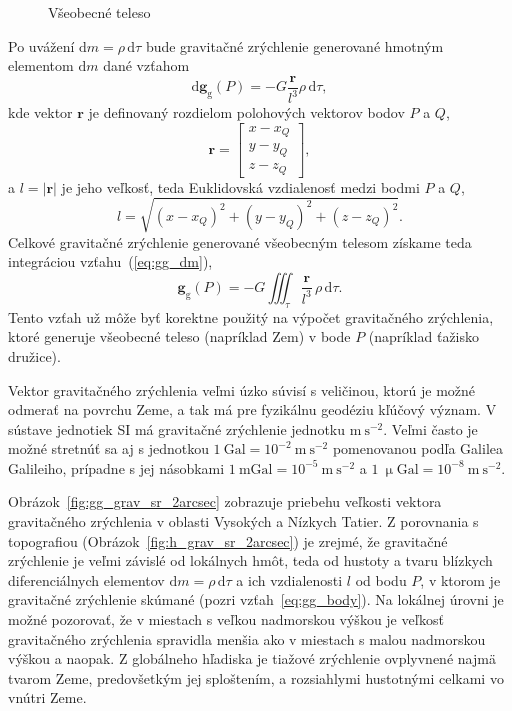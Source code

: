 \documentclass[a4paper, 12pt]{book}
\newcommand{\diff}{\mathrm d}
\newcommand{\gidx}{\mathrm g}
\let\vec\mathbf
\begin{document}
\begin{figure}
\centering

\caption{Všeobecné teleso}
\label{fig:gravitating_body}
\end{figure}

Po uvážení $\diff m = \rho \, \diff \tau$ bude gravitačné zrýchlenie generované 
hmotným elementom $\diff m$ dané vzťahom
%
\begin{equation}
\label{eq:gg_dm}
\diff \vec g_\gidx(P) = -G \frac{\vec r}{l^3} \rho \, \diff\tau{,}
\end{equation}
%
kde vektor $\vec r$ je definovaný rozdielom polohových vektorov bodov $P$ 
a $Q$,
%
\begin{equation}
\label{eq:r}
\vec r = 
%
\begin{bmatrix}
x - x_Q \\
y - y_Q \\
z - z_Q
\end{bmatrix}
{,}
\end{equation}
%
a $l = | \vec r |$ je jeho veľkosť, teda Euklidovská vzdialenosť medzi bodmi 
$P$ a $Q$,
%
\begin{equation}
\label{eq:l}
l = \sqrt{(x - x_Q)^2 + (y - y_Q)^2 + (z - z_Q)^2}{.}
\end{equation}
%
Celkové gravitačné zrýchlenie generované všeobecným telesom získame teda 
integráciou vzťahu~(\ref{eq:gg_dm}),
%
\begin{equation}
\label{eq:gg_body}
\vec g_\gidx(P) = -G \iiint_{\tau} \frac{\vec r}{l^3} \, \rho \, \diff\tau{.}
\end{equation}
%
Tento vzťah už môže byť korektne použitý na výpočet gravitačného zrýchlenia, 
ktoré generuje všeobecné teleso (napríklad Zem) v bode $P$ (napríklad ťažisko 
družice).

Vektor gravitačného zrýchlenia veľmi úzko súvisí s veličinou, ktorú je možné 
odmerať na povrchu Zeme, a tak má pre fyzikálnu geodéziu kľúčový význam.  
V sústave jednotiek SI má gravitačné zrýchlenie jednotku $\mathrm{m}\ 
\mathrm{s}^{-2}$.  Veľmi často je možné stretnúť sa aj s jednotkou $1\ 
\mathrm{Gal} = 10^{-2}\ \mathrm{m}\ \mathrm{s}^{-2}$ pomenovanou podľa Galilea 
Galileiho, prípadne s jej násobkami $1\ \mathrm{mGal} = 10^{-5}\ \mathrm{m}\ 
\mathrm{s}^{-2}$ a $1\ \upmu \mathrm{Gal} = 10^{-8}\ \mathrm{m}\ 
\mathrm{s}^{-2}$.

Obrázok~\ref{fig:gg_grav_sr_2arcsec} zobrazuje priebehu veľkosti vektora 
gravitačného zrýchlenia v oblasti Vysokých a Nízkych Tatier.  Z porovnania 
s topografiou (Obrázok~\ref{fig:h_grav_sr_2arcsec}) je zrejmé, že gravitačné 
zrýchlenie je veľmi závislé od lokálnych hmôt, teda od hustoty a tvaru blízkych 
diferenciálnych elementov $\diff m = \rho \, \diff \tau$ a ich vzdialenosti $l$ 
od bodu $P$, v ktorom je gravitačné zrýchlenie skúmané (pozri 
vzťah~\ref{eq:gg_body}).  Na lokálnej úrovni je možné pozorovať, že v miestach 
s veľkou nadmorskou výškou je veľkosť gravitačného zrýchlenia spravidla menšia 
ako v miestach s malou nadmorskou výškou a naopak.  Z globálneho hľadiska je 
tiažové zrýchlenie ovplyvnené najmä tvarom Zeme, predovšetkým jej sploštením, 
a rozsiahlymi hustotnými celkami vo vnútri Zeme.
\end{document}
